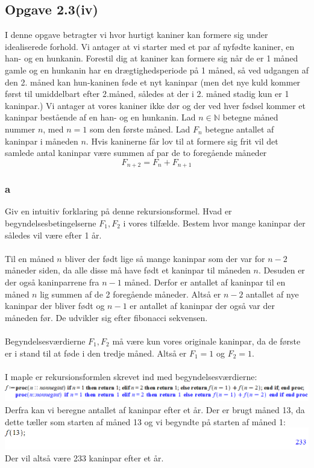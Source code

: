 \documentclass[12pt]{article}
\begin{document}
\subsection*{Opgave 2.3(iv)}
I denne opgave betragter vi hvor hurtigt kaniner kan formere sig under idealiserede forhold. Vi antager at vi starter med et par af nyfødte kaniner,
en han- og en hunkanin. Forestil dig at kaniner kan formere sig når de er
1 måned gamle og en hunkanin har en drægtighedsperiode på 1 måned, så
ved udgangen af den 2. måned kan hun-kaninen føde et nyt kaninpar (men
det nye kuld kommer først til umiddelbart efter 2.måned, således at der i 2.
måned stadig kun er 1 kaninpar.) Vi antager at vores kaniner ikke dør og der
ved hver fødsel kommer et kaninpar bestående af en han- og en hunkanin.
Lad $n \in \mathbb{N}$ betegne måned nummer $n$, med $n = 1$ som den første måned.
Lad $F_n$ betegne antallet af kaninpar i måneden $n$. Hvis kaninerne får lov til
at formere sig frit vil det samlede antal kaninpar være summen af par de to
foregående måneder
$$F_{n+2}=F_n+F_{n+1}$$

\subsubsection*{a}
Giv en intuitiv forklaring på denne rekursionsformel. Hvad er begyndelsesbetingelserne $F_1,F_2$ i vores tilfælde. Bestem hvor mange kaninpar der således vil være efter 1 år.\\
\\
Til en måned $n$ bliver der født lige så mange kaninpar som der var for $n-2$ måneder siden, da alle disse må have født et kaninpar til måneden $n$. Desuden er der også kaninparrene fra $n-1$ måned. Derfor er antallet af kaninpar til en måned $n$ lig summen af de 2 foregående måneder. Altså er $n-2$ antallet af nye kaninpar der bliver født og $n-1$ er antallet af kaninpar der også var der måneden før. De udvikler sig efter fibonacci sekvensen.\\
\\
Begyndelsesværdierne $F_1,F_2$ må være kun vores originale kaninpar, da de første er i stand til at føde i den tredje måned. Altså er $F_1=1$ og $F_2=1$.\\
\\
I maple er rekursionsformlen skrevet ind med begyndelsesværdierne:\\
\includegraphics[scale=0.6]{Pic10}\\
Derfra kan vi beregne antallet af kaninpar efter et år. Der er brugt måned 13, da dette tæller som starten af måned 13 og vi begyndte på starten af måned 1:\\
\includegraphics[scale=0.6]{Pic11}\\
Der vil altså være 233 kaninpar efter et år.
\end{document}
